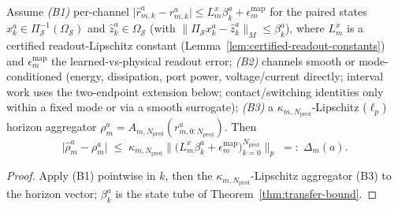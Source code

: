 \begin{proposition}\label{prop:channel-reliability}
Assume
\emph{(B1)} per-channel $\lvert\hat r_{m,k}^a-r_{m,k}^a\rvert\le L_{m}^{x}\beta_k^a+\epsilon_{m}^{\mathrm{map}}$ for the paired states $x_k^a\in\Pi_{\mathcal S}^{-1}(\Omega_{\mathcal S})$ and $\hat z_k^a\in\Omega_{\mathcal S}$ (with $\lVert\Pi_{\mathcal S}x_k^a-\hat z_k^a\rVert_M\le\beta_k^a$), where $L_m^x$ is a certified readout-Lipschitz constant (Lemma~\ref{lem:certified-readout-constants}) and $\epsilon_m^{\mathrm{map}}$ the learned-vs-physical readout error;
\emph{(B2)} channels smooth or mode-conditioned (energy, dissipation, port power, voltage/current directly; interval work uses the two-endpoint extension below; contact/switching identities only within a fixed mode or via a smooth surrogate);
\emph{(B3)} a $\kappa_{m,{N_{\mathrm{pred}}}}$-Lipschitz ($\ell_p$) horizon aggregator $\rho_m^a=A_{m,{N_{\mathrm{pred}}}}(r_{m,0:{N_{\mathrm{pred}}}}^a)$.
Then
\begin{equation}
\bigl|\hat\rho_m^a-\rho_m^a\bigr|\;\le\;\kappa_{m,{N_{\mathrm{pred}}}}\bigl\lVert\bigl(L_m^x\beta_k^a+\epsilon_m^{\mathrm{map}}\bigr)_{k=0}^{{N_{\mathrm{pred}}}}\bigr\rVert_p\;=:\;\Delta_m(a).
\end{equation}
\end{proposition}
\begin{proof}
Apply (B1) pointwise in $k$, then the $\kappa_{m,{N_{\mathrm{pred}}}}$-Lipschitz aggregator (B3) to the horizon vector; $\beta_k^a$ is the state tube of Theorem~\ref{thm:transfer-bound}.
\end{proof}

